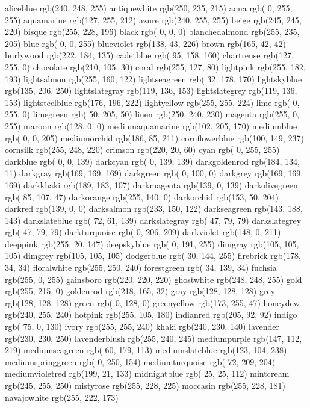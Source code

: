 aliceblue rgb(240, 248, 255)
antiquewhite rgb(250, 235, 215)
aqua rgb( 0, 255, 255)
aquamarine rgb(127, 255, 212)
azure rgb(240, 255, 255)
beige rgb(245, 245, 220)
bisque rgb(255, 228, 196)
black rgb( 0, 0, 0)
blanchedalmond rgb(255, 235, 205)
blue rgb( 0, 0, 255)
blueviolet rgb(138, 43, 226)
brown rgb(165, 42, 42)
burlywood rgb(222, 184, 135)
cadetblue rgb( 95, 158, 160)
chartreuse rgb(127, 255, 0)
chocolate rgb(210, 105, 30)
coral rgb(255, 127, 80)
lightpink rgb(255, 182, 193)
lightsalmon rgb(255, 160, 122)
lightseagreen rgb( 32, 178, 170)
lightskyblue rgb(135, 206, 250)
lightslategray rgb(119, 136, 153)
lightslategrey rgb(119, 136, 153)
lightsteelblue rgb(176, 196, 222)
lightyellow rgb(255, 255, 224)
lime rgb( 0, 255, 0)
limegreen rgb( 50, 205, 50)
linen rgb(250, 240, 230)
magenta rgb(255, 0, 255)
maroon rgb(128, 0, 0)
mediumaquamarine rgb(102, 205, 170)
mediumblue rgb( 0, 0, 205)
mediumorchid rgb(186, 85, 211)
cornflowerblue rgb(100, 149, 237)
cornsilk rgb(255, 248, 220)
crimson rgb(220, 20, 60)
cyan rgb( 0, 255, 255)
darkblue rgb( 0, 0, 139)
darkcyan rgb( 0, 139, 139)
darkgoldenrod rgb(184, 134, 11)
darkgray rgb(169, 169, 169)
darkgreen rgb( 0, 100, 0)
darkgrey rgb(169, 169, 169)
darkkhaki rgb(189, 183, 107)
darkmagenta rgb(139, 0, 139)
darkolivegreen rgb( 85, 107, 47)
darkorange rgb(255, 140, 0)
darkorchid rgb(153, 50, 204)
darkred rgb(139, 0, 0)
darksalmon rgb(233, 150, 122)
darkseagreen rgb(143, 188, 143)
darkslateblue rgb( 72, 61, 139)
darkslategray rgb( 47, 79, 79)
darkslategrey rgb( 47, 79, 79)
darkturquoise rgb( 0, 206, 209)
darkviolet rgb(148, 0, 211)
deeppink rgb(255, 20, 147)
deepskyblue rgb( 0, 191, 255)
dimgray rgb(105, 105, 105)
dimgrey rgb(105, 105, 105)
dodgerblue rgb( 30, 144, 255)
firebrick rgb(178, 34, 34)
floralwhite rgb(255, 250, 240)
forestgreen rgb( 34, 139, 34)
fuchsia rgb(255, 0, 255)
gainsboro rgb(220, 220, 220)
ghostwhite rgb(248, 248, 255)
gold rgb(255, 215, 0)
goldenrod rgb(218, 165, 32)
gray rgb(128, 128, 128)
grey rgb(128, 128, 128)
green rgb( 0, 128, 0)
greenyellow rgb(173, 255, 47)
honeydew rgb(240, 255, 240)
hotpink rgb(255, 105, 180)
indianred rgb(205, 92, 92)
indigo rgb( 75, 0, 130)
ivory rgb(255, 255, 240)
khaki rgb(240, 230, 140)
lavender rgb(230, 230, 250)
lavenderblush rgb(255, 240, 245)
mediumpurple rgb(147, 112, 219)
mediumseagreen rgb( 60, 179, 113)
mediumslateblue rgb(123, 104, 238)
mediumspringgreen rgb( 0, 250, 154)
mediumturquoise rgb( 72, 209, 204)
mediumvioletred rgb(199, 21, 133)
midnightblue rgb( 25, 25, 112)
mintcream rgb(245, 255, 250)
mistyrose rgb(255, 228, 225)
moccasin rgb(255, 228, 181)
navajowhite rgb(255, 222, 173)
